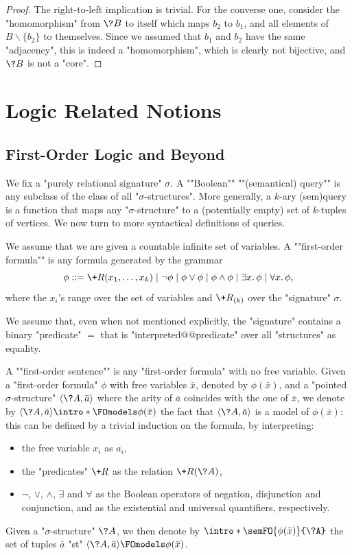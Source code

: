 \begin{proof}
	The right-to-left implication is trivial.
	For the converse one, consider the "homomorphism" from $\?B$ to itself
	which maps $b_2$ to $b_1$, and all elements of $B \smallsetminus \{b_2\}$
	to themselves. Since we assumed that $b_1$ and $b_2$ have the same "adjacency",
	this is indeed a "homomorphism", which is clearly not bijective, and
	$\?B$ is not a "core".
\end{proof}

\section{Logic Related Notions}

\subsection{First-Order Logic and Beyond}
\label{sec:prelim-fo}

We fix a "purely relational signature" $\sigma$.
A  \AP""Boolean"" ""(semantical) query"" is any subclass of the
class of all "$\sigma$-structures".
More generally, a $k$-ary \reintro(sem){query} is a function
that maps any "$\sigma$-structure" to a (potentially empty) set of $k$-tuples
of vertices.
We now turn to more syntactical definitions of queries.

We assume that we are given a countable infinite set of variables.
A \AP""first-order formula"" is any formula generated by the grammar 
\[
	\phi \mathrel{{:}{:}{=}} \+R(x_1,\dotsc,x_k) \mid \neg \phi \mid \phi \lor \phi \mid \phi \land \phi
	\mid \exists x.\, \phi \mid \forall x.\, \phi,
\]
where the $x_i$'s range over the set of variables and $\+R_{(k)}$ over the "signature" $\sigma$.

\begin{hypothesis}
We assume that, even when not mentioned explicitly, the "signature" contains
a binary "predicate" $=$ that is "interpreted@@predicate" over all "structures"
as equality.
\end{hypothesis}

A \AP""first-order sentence"" is any "first-order formula" with no free variable.
Given a "first-order formula" $\phi$ with free variables $\bar x$, denoted by $\phi(\bar x)$,
and a "pointed $\sigma$-structure" $\tup{\?A,\bar a}$ where the arity of $\bar a$ coincides with
the one of $\bar x$, we denote by $\tup{\?A,\bar a} \intro*\FOmodels \phi(\bar x)$
the fact that $\tup{\?A,\bar a}$ is a model of $\phi(\bar x)$: this can be defined by
a trivial induction on the formula, by interpreting:
\begin{itemize}
	\item the free variable $x_i$ as $a_i$,
	\item the "predicates" $\+R$ as the relation $\+R(\?A)$,
	\item $\neg$, $\lor$, $\land$, $\exists$ and $\forall$ as the Boolean operators of negation, disjunction and conjunction, and as the existential and universal quantifiers, respectively.
\end{itemize}
Given a "$\sigma$-structure" $\?A$, we then denote by \AP$\intro*\semFO{\phi(\bar x)}{\?A}$
the set of tuples $\bar a$ "st" $\tup{\?A, \bar a} \FOmodels \phi(\bar x)$.

